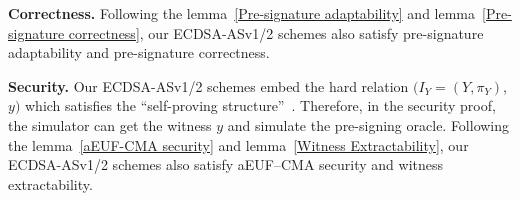 \documentclass{llncs}
\begin{document}
\begin{trivlist}
\item \textbf{Correctness.} Following the lemma~\ref{Pre-signature adaptability} and lemma~\ref{Pre-signature correctness}, our ECDSA-ASv1/2 schemes also satisfy pre-signature adaptability and pre-signature correctness.
\end{trivlist}

\begin{trivlist}
\item \textbf{Security.} Our ECDSA-ASv1/2 schemes embed the hard relation $(I_Y=(Y,\pi_Y)$, $y)$ which satisfies the ``self-proving structure''~\cite{AumayrEEFHMMR20}. Therefore, in the security proof, the simulator can get the witness $y$ and simulate the pre-signing oracle. Following the lemma~\ref{aEUF-CMA security} and lemma~\ref{Witness Extractability}, our ECDSA-ASv1/2 schemes also satisfy aEUF–CMA security and witness extractability.
\end{trivlist}


\end{document}
